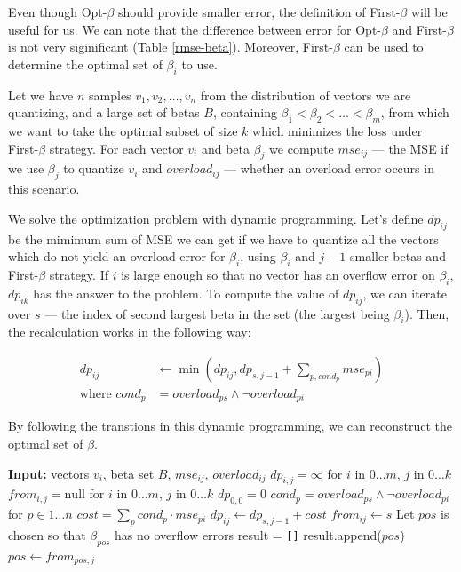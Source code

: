 \documentclass{article}
\theoremstyle{plain}
\theoremstyle{definition}
\theoremstyle{remark}
\begin{document}
Even though Opt-$\beta$ should provide smaller error, the definition of First-$\beta$ will be useful for us. We can note that the difference between error for Opt-$\beta$ and First-$\beta$ is not very siginificant (Table \ref{rmse-beta}). Moreover, First-$\beta$ can be used to determine the optimal set of $\beta_i$ to use.

Let we have $n$ samples $v_1, v_2, \ldots, v_n$ from the distribution of vectors we are quantizing, and a large set of betas $B$, containing $\beta_1 < \beta_2 < \ldots < \beta_m$, from which we want to take the optimal subset of size $k$ which minimizes the loss under First-$\beta$ strategy. For each vector $v_i$ and beta $\beta_j$ we compute $mse_{ij}$ --- the MSE if we use $\beta_j$ to quantize $v_i$ and $overload_{ij}$ --- whether an overload error occurs in this scenario.

We solve the optimization problem with dynamic programming. Let's define $dp_{ij}$ be the mimimum sum of MSE we can get if we have to quantize all the vectors which do not yield an overload error for $\beta_i$, using $\beta_i$ and $j - 1$ smaller betas and First-$\beta$ strategy. If $i$ is large enough so that no vector has an overflow error on $\beta_i$, $dp_{ik}$ has the answer to the problem. To compute the value of $dp_{ij}$, we can iterate over $s$ --- the index of second largest beta in the set (the largest being $\beta_i$). Then, the recalculation works in the following way:

\begin{align*}
    dp_{ij} &\leftarrow \min\left(dp_{ij}, dp_{s, j-1} + \sum_{p, cond_p} mse_{pi} \right) \\
    \text{where } cond_p &= overload_{ps} \wedge \neg overload_{pi}
\end{align*}

By following the transtions in this dynamic programming, we can reconstruct the optimal set of $\beta$.

\begin{algorithm}[h]
\caption{Dynamic programming for finding the set of $\beta$}
\label{alg:DP}
\begin{algorithmic}[1]

\State \textbf{Input:} vectors $v_i$, beta set $B$, $mse_{ij}$, $overload_{ij}$
\State $dp_{i, j} = \infty$ for $i$ in $0\ldots m$, $j$ in $0\ldots k$
\State $from_{i, j} = \text{null}$ for $i$ in $0\ldots m$, $j$ in $0\ldots k$
\State $dp_{0, 0} = 0$
            \State $cond_p = overload_{ps} \wedge \neg overload_{pi}$ for $p \in 1\ldots n$
            \State $cost = \sum_p cond_p \cdot mse_{pi}$
                \State $dp_{ij} \leftarrow dp_{s, j-1} + cost$
                \State $from_{ij} \leftarrow s$
            \EndIf
        \EndFor
    \EndFor
\EndFor
\State Let $pos$ is chosen so that $\beta_{pos}$ has no overflow errors
\State result = \verb|[]|
\State result.append($pos$)
\State $pos \leftarrow from_{pos, j}$
\EndFor

\end{algorithmic}
\end{algorithm}
\end{document}
